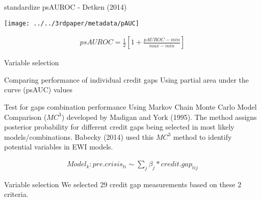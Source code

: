 \documentclass[
  ignorenonframetext,
]{beamer}
\begin{document}
\begin{frame}{standardize psAUROC - Detken (2014)}
\protect\hypertarget{standardize-psauroc---detken-2014}{}
\begin{center}\texttt{[image: ../../3rdpaper/metadata/pAUC]} \end{center}

\begin{align}
psAUROC = \frac{1}{2}\left[ 1+ \frac{pAUROC - min}{max - min}\right]
\end{align}
\end{frame}

\begin{frame}{Variable selection}
\protect\hypertarget{variable-selection}{}
\begin{block}{Comparing performance of individual credit gaps}
\protect\hypertarget{comparing-performance-of-individual-credit-gaps}{}
Using partial area under the curve (psAUC) values
\end{block}

\begin{block}{Test for gaps combination performance}
\protect\hypertarget{test-for-gaps-combination-performance}{}
Using Markov Chain Monte Carlo Model Comparison (\(MC^3\)) developed by
Madigan and York (1995). The method assigns posterior probability for
different credit gaps being selected in most likely models/combinations.
Babecky (2014) used this \(MC^3\) method to identify potential variables
in EWI models.

\begin{align*}
Model_k :  pre.crisis_{ti} \sim \sum\nolimits_j \beta_j * credit.gap_{tij}
\end{align*}
\end{block}

\begin{block}{Variable selection}
\protect\hypertarget{variable-selection-1}{}
We selected 29 credit gap measurements based on these 2 criteria.
\end{block}
\end{frame}
\end{document}
